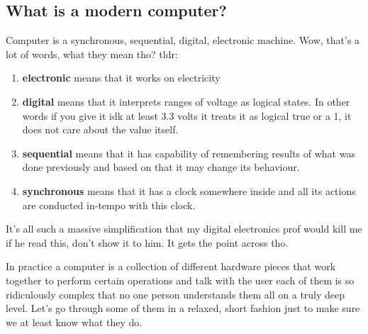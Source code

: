 \documentclass[../ops.tex]{subfiles}
\begin{document}
        \subsection{What is a modern computer?}
        Computer is a synchronous, sequential, digital, electronic machine. Wow,
        that's a lot of words, what they mean tho? tldr:
        \begin{enumerate}
                \item {\bf electronic} means that it works on electricity
                \item {\bf digital} means that it interprets ranges of voltage
                        as logical states. In other words if you give it idk at
                        least 3.3 volts it treats it as logical true or a 1, it
                        does not care about the value itself.
                \item {\bf sequential} means that it has capability of
                        remembering results of what was done previously and
                        based on that it may change its behaviour.
                \item {\bf synchronous} means that it has a clock somewhere
                        inside and all its actions are conducted in-tempo with
                        this clock.
        \end{enumerate}
        It's all such a massive simplification that my digital electronics prof
        would kill me if he read this, don't show it to him. It gets the point
        across tho.

        In practice a computer is a collection of different hardware pieces that
        work together to perform certain operations and talk with the user each
        of them is so ridiculously complex that no one person understands them
        all on a truly deep level. Let's go through some of them in a relaxed,
        short fashion just to make sure we at least know what they do.
\end{document}
